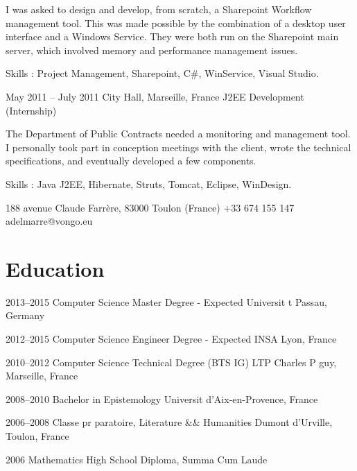 \documentclass[fontsize=10pt]{tccv}
\begin{document}
\begin{eventlist}
I was asked to design and develop, from scratch, a Sharepoint Workflow management tool. This was made possible by the combination of a desktop user interface and a Windows Service. They were both run on the Sharepoint main server, which involved memory and performance management issues.

Skills : Project Management, Sharepoint, C#, WinService, Visual Studio.

\item{May 2011 -- July 2011}
     {City Hall, Marseille, France}
     {J2EE Development (Internship)}

The Department of Public Contracts needed a monitoring and management tool.
I personally took part in conception meetings with the client, wrote the technical specifications, and eventually developed a few components.

Skills : Java J2EE, Hibernate, Struts, Tomcat, Eclipse, WinDesign.

\end{eventlist}

\personal
    {188 avenue Claude Farrère, 83000 Toulon (France)}
    {+33 674 155 147}
    {adelmarre@vongo.eu}

\section{Education}

\begin{list}

\item{2013--2015}
     {Computer Science Master Degree - Expected}
     {Universit t Passau, Germany}

\item{2012--2015}
     {Computer Science Engineer Degree - Expected}
     {INSA Lyon, France}

\item{2010--2012}
     {Computer Science Technical Degree (BTS IG)}
     {LTP Charles P guy, Marseille, France}

\item{2008--2010}
     {Bachelor in Epistemology}
     {Universit d'Aix-en-Provence, France}

\item{2006--2008}
     {Classe pr paratoire, Literature && Humanities}
     {Dumont d'Urville, Toulon, France}

\item{2006}
     {Mathematics High School Diploma, Summa Cum Laude}

\end{list}
\end{document}
